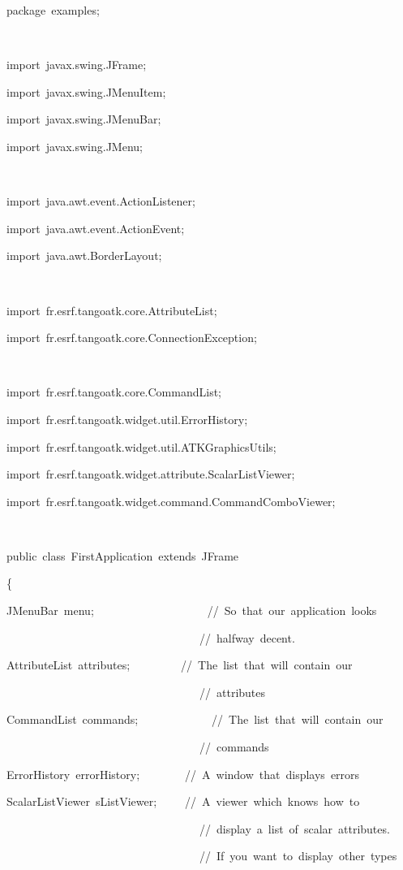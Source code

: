 
\begin{lyxcode}
package~examples;

~

import~javax.swing.JFrame;

import~javax.swing.JMenuItem;

import~javax.swing.JMenuBar;

import~javax.swing.JMenu;

~

import~java.awt.event.ActionListener;

import~java.awt.event.ActionEvent;

import~java.awt.BorderLayout;

~

import~fr.esrf.tangoatk.core.AttributeList;

import~fr.esrf.tangoatk.core.ConnectionException;

~

import~fr.esrf.tangoatk.core.CommandList;

import~fr.esrf.tangoatk.widget.util.ErrorHistory;

import~fr.esrf.tangoatk.widget.util.ATKGraphicsUtils;

import~fr.esrf.tangoatk.widget.attribute.ScalarListViewer;

import~fr.esrf.tangoatk.widget.command.CommandComboViewer;

~

public~class~FirstApplication~extends~JFrame

\{

JMenuBar~menu;~~~~~~~~~~~~~~~~~~~~//~So~that~our~application~looks

~~~~~~~~~~~~~~~~~~~~~~~~~~~~~~~~~~//~halfway~decent.

AttributeList~attributes;~~~~~~~~~//~The~list~that~will~contain~our

~~~~~~~~~~~~~~~~~~~~~~~~~~~~~~~~~~//~attributes

CommandList~commands;~~~~~~~~~~~~~//~The~list~that~will~contain~our

~~~~~~~~~~~~~~~~~~~~~~~~~~~~~~~~~~//~commands

ErrorHistory~errorHistory;~~~~~~~~//~A~window~that~displays~errors

ScalarListViewer~sListViewer;~~~~~//~A~viewer~which~knows~how~to

~~~~~~~~~~~~~~~~~~~~~~~~~~~~~~~~~~//~display~a~list~of~scalar~attributes.

~~~~~~~~~~~~~~~~~~~~~~~~~~~~~~~~~~//~If~you~want~to~display~other~types


\end{lyxcode}

